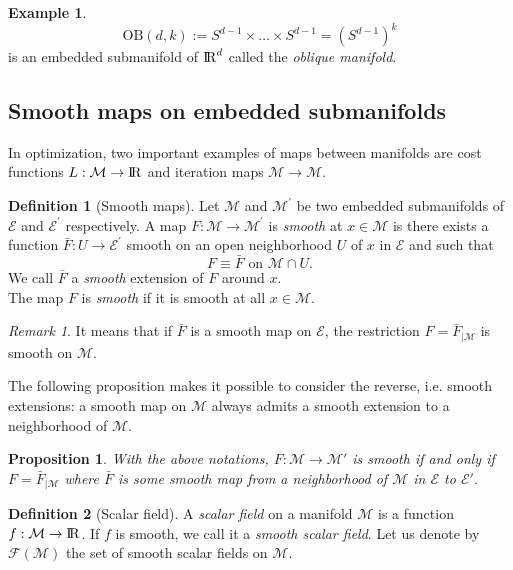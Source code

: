 \documentclass[10pt,a4paper]{book}
\theoremstyle{definition}
\newtheorem{defn}{Definition}[section]
\newtheorem{exm}{Example}[section]
\theoremstyle{plain}
\newtheorem{prop}{Proposition}[section]
\theoremstyle{remark}
\newtheorem{rmk}{Remark}[section]
\newcommand \M {\mathcal{M}}
\def\R{{\rm I\kern-0.16em R}}
\begin{document}
\begin{exm}
$$\text{OB}(d,k):=S^{d-1}\times \dots \times S^{d-1}=(S^{d-1})^k$$ is an embedded submanifold of $\R^d$ called the \emph{oblique manifold}. 
\end{exm}

\subsection{Smooth maps on embedded submanifolds}
In optimization, two important examples of maps between manifolds are cost functions $L:\mathcal{M}\to \R$ and iteration maps $\mathcal{M}\to \mathcal{M}$.
\begin{defn}[Smooth maps]
Let $\M$ and $\M^{\prime}$ be two embedded submanifolds of $\mathcal{E}$ and $\mathcal{E}^{\prime}$ respectively. A map $F:\M\to\M^{\prime}$ is \emph{smooth} at $x\in \M$ is there exists a function $\bar{F}:U \to \mathcal{E}^{\prime}$ smooth on an open neighborhood $U$ of $x$ in $\mathcal{E}$ and such that
$$F\equiv \bar{F}\text{ on } \M \cap U.$$
We call $\bar{F}$ a \emph{smooth} extension of $F$ around $x$.\\
The map $F$ is \emph{smooth} if it is smooth at all $x\in \M$.
\end{defn}
\begin{rmk}
It means that if $\bar{F}$ is a smooth map on $\mathcal{E}$, the restriction $F=\bar{F}_{\mid \M}$ is smooth on $\M$.
\end{rmk}
The following proposition makes it possible to consider the reverse, i.e. smooth extensions: a smooth map on $\M$ always admits a smooth extension to a neighborhood of $\M$. 
\begin{prop}
With the above notations, $F:\M \to \M'$ is smooth if and only if $F=\bar{F}_{\mid \M}$ where $\bar{F}$ is some smooth map from a neighborhood of $\M$ in $\mathcal{E}$ to $\mathcal{E}'$.
\end{prop}
\begin{defn}[Scalar field]
A \emph{scalar field} on a manifold $\M$ is a function $f:\M \to \R$. If $f$ is smooth, we call it a \emph{smooth scalar field}. Let us denote by $\mathcal{F}(\M)$ the set of smooth scalar fields on $\M$.
\end{defn}
\end{document}

